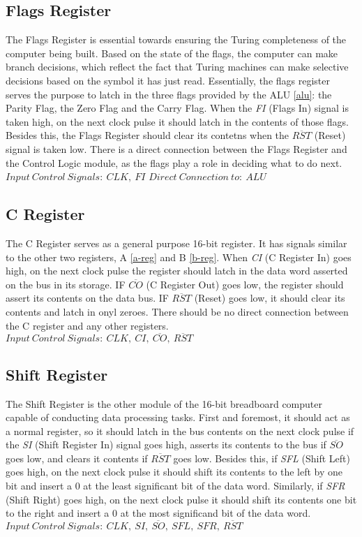 \subsection{Flags Register} \label{flags}
The Flags Register is essential towards ensuring the Turing completeness of the computer being built. Based on the state of the
flags, the computer can make branch decisions, which reflect the fact that Turing machines can make selective decisions based
on the symbol it has just read.
Essentially, the flags register serves the purpose to latch in the three flags provided by the ALU \ref{alu}: the Parity Flag, the
Zero Flag and the Carry Flag. When the \emph{FI} (Flags In) signal is taken high, on the next clock pulse it should latch in the
contents of those flags. Besides this, the Flags Register should clear its contetns when the \emph{$\overline{RST}$} (Reset) signal
is taken low. There is a direct connection between the Flags Register and the Control Logic module, as the flags play a role in
deciding what to do next. \\
\textbf{$Input\:Control\:Signals:\:CLK,\:FI$}
\textbf{$Direct\:Connection\:to:\:ALU$}

\subsection{C Register} \label{c-reg}
The C Register serves as a general purpose 16-bit register. It has signals similar to the other two registers, A \ref{a-reg} and
B \ref{b-reg}. When \emph{CI} (C Register In) goes high, on the next clock pulse the register should latch in the data word
asserted on the bus in its storage. IF \emph{$\overline{CO}$} (C Register Out) goes low, the register should assert its contents
on the data bus. IF \emph{$\overline{RST}$} (Reset) goes low, it should clear its contents and latch in onyl zeroes. There should
be no direct connection between the C register and any other registers. \\
\textbf{$Input\:Control\:Signals:\:CLK,\:CI,\:\overline{CO},\:\overline{RST}$}

\subsection{Shift Register} \label{shift-reg}
The Shift Register is the other module of the 16-bit breadboard computer capable of conducting data processing tasks. First and
foremost, it should act as a normal register, so it should latch in the bus contents on the next clock pulse if the \emph{SI}
(Shift Register In) signal goes high, asserts its contents to the bus if \emph{$\overline{SO}$} goes low, and clears it contents
if \emph{$\overline{RST}$} goes low. Besides this, if \emph{SFL} (Shift Left) goes high, on the next clock pulse it should shift its
contents to the left by one bit and insert a 0 at the least significant bit of the data word. Similarly, if \emph{SFR}
(Shift Right) goes high, on the next clock pulse it should shift its contents one bit to the right and insert a 0 at the most
significand bit of the data word. \\
\textbf{$Input\:Control\:Signals:\:CLK,\:SI,\:\overline{SO},\:SFL,\:SFR,\:\overline{RST}$}


